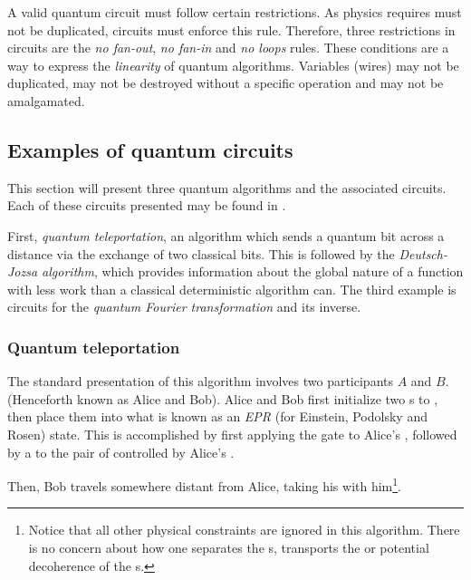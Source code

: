 A valid quantum circuit must follow certain restrictions. As physics requires
\qubits{} must not be duplicated, circuits must enforce this rule.
 Therefore, three restrictions in circuits are the \emph{no fan-out},
\emph{no fan-in} and \emph{no loops} rules. These conditions are  a
way to express the \emph{linearity} of quantum algorithms. Variables (wires)
may not be duplicated, may not be destroyed without a specific
operation and may not be amalgamated.


\subsection{Examples of quantum circuits} %
\label{sub:examples_of_quantum_circuits}


This section will present three quantum algorithms
and the associated circuits.
Each of these circuits presented may be found  in \cite{neilsen2000:QuantumComputationAndInfo}.

First, \emph{quantum teleportation}, an algorithm which sends a quantum bit
 across a distance via the exchange of two classical bits. This is
followed by the \emph{Deutsch-Jozsa algorithm},
which provides information about the
global nature of a function with less work than a classical deterministic
algorithm can. The third example is  circuits for the
\emph{quantum Fourier transformation} and its inverse.

\subsubsection{Quantum teleportation} %
\label{ssub:quantum_teleportation}


The standard presentation of this algorithm involves two
participants $A$ and $B$.
(Henceforth known as Alice and Bob). Alice and Bob first
initialize two \qubit{}s
to , then place them into what is known
 as an \emph{EPR} (for Einstein,
Podolsky and Rosen) state. This is accomplished by first applying the \Had{}
gate to Alice's \qubit{}, followed by a \Cnot{} to the pair of \qubits{}
 controlled
by Alice's \qubit{}.

Then, Bob travels somewhere distant from Alice, taking his \qubit{} with
him\footnote{Notice that all other physical constraints are ignored in this
algorithm. There is no concern about how one separates the \qubit{}s, transports
the \qubit{} or potential decoherence of the \qubit{}s.}.

